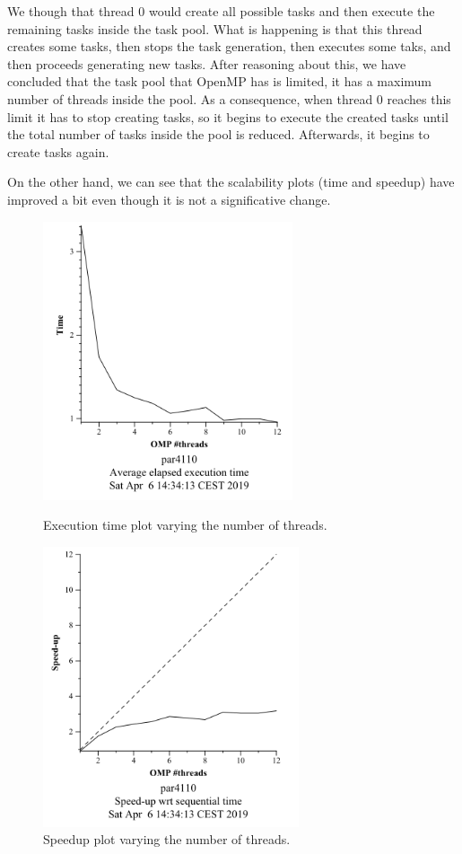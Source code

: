 \documentclass[12pt, a4paper]{article}
\begin{document}
We though that thread 0 would create all possible tasks and then execute the remaining tasks inside the task pool. What is happening is that this thread creates some tasks, then stops the task generation, then executes some taks, and then proceeds generating new tasks. After reasoning about this, we have concluded that the task pool that OpenMP has is limited, it has a maximum number of threads inside the pool. As a consequence, when thread 0 reaches this limit it has to stop creating tasks, so it begins to execute the created tasks until the total number of tasks inside the pool is reduced. Afterwards, it begins to create tasks again.

On the other hand, we can see that the scalability plots (time and speedup) have improved a bit even though it is not a significative change.

\begin{figure}[H]
\centering
\begin{minipage}[b]{0.4\linewidth}
  \centering
  \includegraphics[scale=0.95]{./mandel-omp-10000-strong-22-2-time}
  \caption{Execution time plot varying the number of threads.}
  \label{fig:mandel-omp-10000-strong-22-2-time}
\end{minipage}%
\hspace{0.5cm}
\begin{minipage}[b]{0.4\linewidth}
  \centering
  \includegraphics[scale=0.95]{./mandel-omp-10000-strong-22-2-speedup}
  \caption{Speedup plot varying the number of threads.}
  \label{fig:mandel-omp-10000-strong-22-2-speedup}
\end{minipage}
\end{figure}
\end{document}
